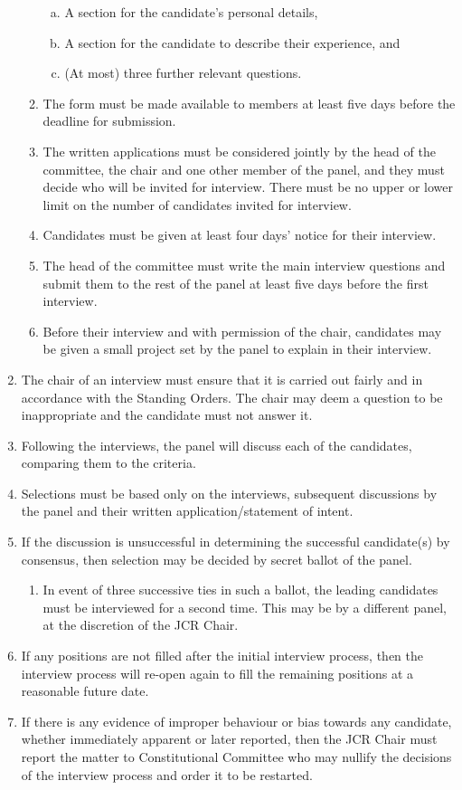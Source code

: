 \documentclass[12pt]{article}  %
\begin{document}
\begin{enumerate}
\begin{enumerate}
\begin{enumerate}[(a)]
			\item A section for the candidate’s personal details,
			\item A section for the candidate to describe their experience, and
			\item (At most) three further relevant questions.
		\end{enumerate}
		\item The form must be made available to members at least five days before the deadline for submission.
		\item The written applications must be considered jointly by the head of the committee, the chair and one other member of the panel, and they must decide who will be invited for interview. There must be no upper or lower limit on the number of candidates invited for interview.
		\item Candidates must be given at least four days’ notice for their interview.
		\item The head of the committee must write the main interview questions and submit them to the rest of the panel at least five days before the first interview. 
		\item Before their interview and with permission of the chair, candidates may be given a small project set by the panel to explain in their interview.
	\end{enumerate}
	\item The chair of an interview must ensure that it is carried out fairly and in accordance with the Standing Orders. The chair may deem a question to be inappropriate and the candidate must not answer it.
	\item Following the interviews, the panel will discuss each of the candidates, comparing them to the criteria.
	\item Selections must be based only on the interviews, subsequent discussions by the panel and their written application/statement of intent.
	\item If the discussion is unsuccessful in determining the successful candidate(s) by consensus, then selection may be decided by secret ballot of the panel.
	\begin{enumerate}
		\item In event of three successive ties in such a ballot, the leading candidates must be interviewed for a second time. This may be by a different panel, at the discretion of the JCR Chair.
	\end{enumerate}
	\item If any positions are not filled after the initial interview process, then the interview process will re-open again to fill the remaining positions at a reasonable future date.
	\item If there is any evidence of improper behaviour or bias towards any candidate, whether immediately apparent or later reported, then the JCR Chair must report the matter to Constitutional Committee who may nullify the decisions of the interview process and order it to be restarted.
\end{enumerate}
\newpage
\end{document}
